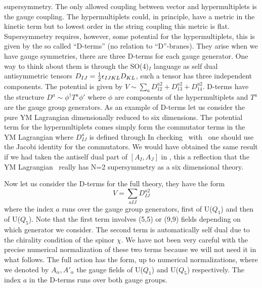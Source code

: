 supersymmetry. The only allowed coupling between vector and 
hypermultiplets is the gauge coupling. 
The hypermultiplets could, in principle, have a metric
in the kinetic term but to lowest order in the
string coupling this metric is flat. 
Supersymmetry requires, however, some potential for the
hypermultiplets, this is given by the so called ``D-terms''
(no relation to ``D''-branes). They arise when we have
gauge symmetries, there are three D-terms for
 each gauge generator. One way to think about them
is through the SO(4)$_I$ language as self dual 
antisymmetric tensors $ D_{IJ} =
 {1 \over 2 } \epsilon_{IJKL} D_{KL} $, such a tensor
has three independent components. The potential is
given by $V \sim \sum_a D^{a2}_{12} + 
 D^{a2}_{13} + D^{a2}_{14} $.
D-terms have the structure $D^a \sim \phi^\dagger T^a \phi'$ 
where $\phi $ are components of the hypermultiplets and
$T^a$ are the gauge group generators. 
As an example of D-terms let us consider the pure
YM Lagrangian dimensionally reduced to six dimensions.
The potential term for the hypermultiplets comes simply 
form the commutator terms in the YM Lagrangian
\eqn{}
where $D_{IJ}^a$ is defined through
\eqn{}
In checking \vym\ with \dym\ one should use the Jacobi 
identity for the commutators. We would have obtained the same
result if we had taken the antiself dual part of
$ [A_I , A_J ]$ in \dym , this a reflection that the YM
Lagrangian \tendym\ really has N=2 supersymmetry as a six dimensional
theory. 

Now let us consider the D-terms for the full theory, they 
have the form
\eqn{}
$$
 V = \sum_{ a I J } D^{a2}_{IJ}
 $$
where the index $a$ runs over the gauge group generators,
first of U($Q_1$) and then of U($Q_5$). Note that the first
term involves (5,5) or (9,9) fields depending on which
generator we consider. 
The second
term  is automatically self dual due to the chirality
condition of the spinor $\chi$. We have not been very careful
with the precise numerical normalization of these two terms
because we will not need it in what follows.
The full action has the form, up to numerical normalizations,
\eqn{}
where we denoted by $A_\alpha , A'_\alpha $ the gauge fields of
U($Q_1$) and U($Q_5$) respectively. The index $a$ in the D-terms 
runs over both gauge groups.

